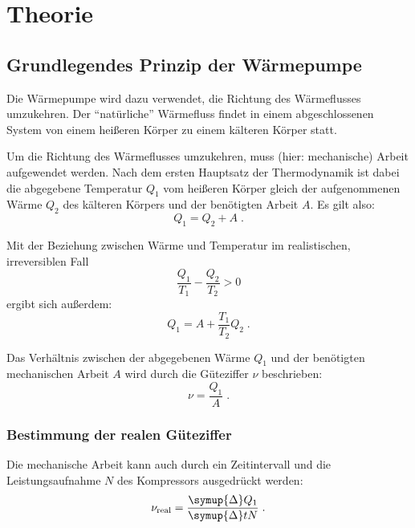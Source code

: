 \section{Theorie} \label{sec:Theorie}

\subsection{Grundlegendes Prinzip der Wärmepumpe}

    Die Wärmepumpe wird dazu verwendet, die Richtung des Wärmeflusses umzukehren.
    Der \enquote{natürliche} Wärmefluss findet in einem abgeschlossenen System von einem heißeren Körper zu einem kälteren Körper statt.

    Um die Richtung des Wärmeflusses umzukehren,
    muss (hier: mechanische) Arbeit aufgewendet werden.
    Nach dem ersten Hauptsatz der Thermodynamik ist dabei die abgegebene Temperatur $Q_1$ vom heißeren Körper gleich der aufgenommenen Wärme $Q_2$ des kälteren Körpers und der benötigten Arbeit $A$.
    Es gilt also:
    \begin{equation*}
        Q_1 = Q_2 + A \; .
    \end{equation*}

    Mit der Beziehung zwischen Wärme und Temperatur im realistischen, irreversiblen Fall
    \begin{equation*}
        \frac{Q_1}{T_1} - \frac{Q_2}{T_2} > 0
    \end{equation*}
    ergibt sich außerdem:
    \begin{equation*}
        Q_1 = A + \frac{T_1}{T_2} Q_2 \; .
    \end{equation*}

    Das Verhältnis zwischen der abgegebenen Wärme $Q_1$ und der benötigten mechanischen Arbeit $A$ wird durch die Güteziffer $\nu$ beschrieben:
    \begin{equation*}
        \nu = \frac{Q_1}{A} \; .
    \end{equation*}


\subsubsection{Bestimmung der realen Güteziffer}

    Die mechanische Arbeit kann auch durch ein Zeitintervall und die Leistungsaufnahme $N$ des Kompressors ausgedrückt werden:
    \begin{equation*}
        \nu_\text{real} = \frac{\symup{\Delta} Q_1}{\symup{\Delta} t N} \; .
    \end{equation*}

